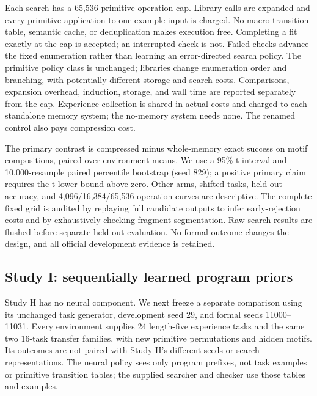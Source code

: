 \documentclass[11pt]{article}
\begin{document}
Each search has a 65,536 primitive-operation cap. Library calls are expanded
and every primitive application to one example input is charged. No macro
transition table, semantic cache, or deduplication makes execution free.
Completing a fit exactly at the cap is accepted; an interrupted check is not.
Failed checks advance the fixed enumeration rather than learning an
error-directed search policy. The primitive policy class is unchanged;
libraries change enumeration order and branching, with potentially different
storage and search costs. Comparisons, expansion overhead, induction, storage,
and wall time are reported separately from the cap. Experience collection is
shared in actual costs and charged to each standalone memory system; the
no-memory system needs none. The renamed control also pays compression cost.

The primary contrast is compressed minus whole-memory exact success on motif
compositions, paired over environment means. We use a 95\% t interval and
10,000-resample paired percentile bootstrap (seed 829); a positive primary
claim requires the t lower bound above zero. Other arms, shifted tasks,
held-out accuracy, and 4,096/16,384/65,536-operation curves are descriptive.
The complete fixed grid is audited by replaying full candidate outputs to
infer early-rejection costs and by exhaustively checking fragment segmentation.
Raw search results are flushed before separate held-out evaluation. No formal
outcome changes the design, and all official development evidence is retained.

\subsection{Study I: sequentially learned program priors}
Study H has no neural component. We next freeze a separate comparison using
its unchanged task generator, development seed 29, and formal seeds
11000--11031. Every environment supplies 24 length-five experience tasks and
the same two 16-task transfer families, with new primitive permutations and
hidden motifs. Its outcomes are not paired with Study H's different seeds
or search representations. The neural policy sees only program prefixes,
not task examples or primitive transition tables; the supplied searcher and
checker use those tables and examples.
\end{document}
